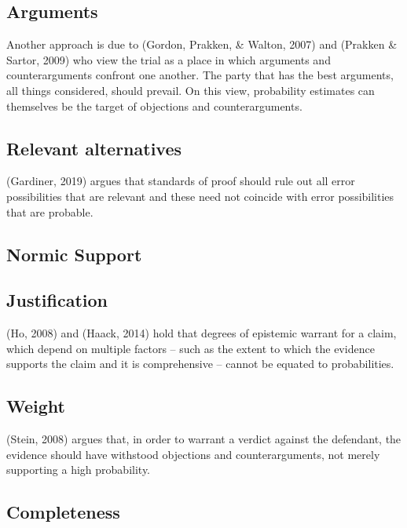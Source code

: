 \documentclass[10pt,dvipsnames]{scrartcl}
\begin{document}
\hypertarget{arguments}{%
\subsection{Arguments}\label{arguments}}

Another approach is due to (Gordon, Prakken, \& Walton, 2007) and
(Prakken \& Sartor, 2009) who view the trial as a place in which
arguments and counterarguments confront one another. The party that has
the best arguments, all things considered, should prevail. On this view,
probability estimates can themselves be the target of objections and
counterarguments.

\hypertarget{relevant-alternatives}{%
\subsection{Relevant alternatives}\label{relevant-alternatives}}

(Gardiner, 2019) argues that standards of proof should rule out all
error possibilities that are relevant and these need not coincide with
error possibilities that are probable.

\hypertarget{normic-support}{%
\subsection{Normic Support}\label{normic-support}}

\hypertarget{justification}{%
\subsection{Justification}\label{justification}}

(Ho, 2008) and (Haack, 2014) hold that degrees of epistemic warrant for
a claim, which depend on multiple factors -- such as the extent to which
the evidence supports the claim and it is comprehensive -- cannot be
equated to probabilities.

\hypertarget{weight}{%
\subsection{Weight}\label{weight}}

(Stein, 2008) argues that, in order to warrant a verdict against the
defendant, the evidence should have withstood objections and
counterarguments, not merely supporting a high probability.

\hypertarget{completeness}{%
\subsection{Completeness}\label{completeness}}
\end{document}
